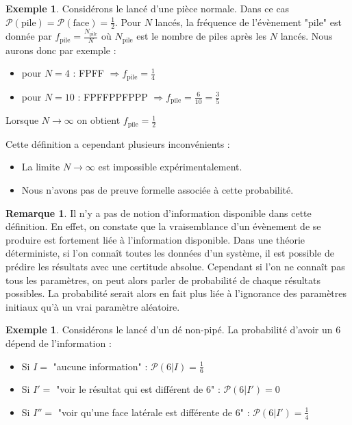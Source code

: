 \documentclass[a4paper,12pt]{report}
\theoremstyle{definition}
\newcommand{\ra}{\rightarrow}
\newcommand{\Ra}{\Rightarrow}
\renewcommand{\(}{\left(}
\renewcommand{\)}{\right)}
\renewcommand{\P}{\mathcal{P}}
\renewcommand{\t}{\text}
\newtheorem{rmk}[thm]{Remarque}
\newtheorem{exmp}[thm]{Exemple}
\begin{document}
        \begin{exmp}
            Considérons le lancé d'une pièce normale. Dans ce cas $\P(\t{pile}) = \P(\t{face}) = \frac{1}{2}$. Pour $N$ lancés, la fréquence de l'évènement "pile" est donnée par $f_{\t{pile}} = \frac{N_{\t{pile}}}{N}$ où $N_{\t{pile}}$ est le nombre de piles après les $N$ lancés. Nous aurons donc par exemple :\\
            \begin{itemize}[label = \textbullet]
                \item pour $N = 4$ : FPFF $\Ra f_{\t{pile}} = \frac{1}{4}$ 
                \item pour $N = 10$ : FPFFPPFPPP $\Ra f_{\t{pile}} = \frac{6}{10} = \frac{3}{5}$
            \end{itemize}
            Lorsque $N\ra\infty$ on obtient $f_{\t{pile}} = \frac{1}{2}$
        \end{exmp}
        
        Cette définition a cependant plusieurs inconvénients :
        \begin{itemize}
            \item La limite $N\ra\infty$ est impossible expérimentalement.
            \item Nous n'avons pas de preuve formelle associée à cette probabilité.
        \end{itemize}
        
        \begin{rmk}
            Il n'y a pas de notion d'information disponible dans cette définition. En effet, on constate que la vraisemblance d'un évènement de se produire est fortement liée à l'information disponible. Dans une théorie déterministe, si l'on connaît toutes les données d'un système, il est possible de prédire les résultats avec une certitude absolue. Cependant si l'on ne connaît pas tous les paramètres, on peut alors parler de probabilité de chaque résultats possibles. La probabilité serait alors en fait plus liée à l'ignorance des paramètres initiaux qu'à un vrai paramètre aléatoire.
        \end{rmk}
        
        \begin{exmp}
            Considérons le lancé d'un dé non-pipé. La probabilité d'avoir un 6 dépend de l'information :
            \begin{itemize}[label = \textbullet]
                \item Si $I =$ "aucune information" : $\P(6|I) = \frac{1}{6}$
                \item Si $I' =$ "voir le résultat qui est différent de 6" : $\P(6|I') = 0$
                \item Si $I'' =$ "voir qu'une face latérale est différente de 6" : $\P(6|I') = \frac{1}{4}$
            \end{itemize}
        \end{exmp}
        
\end{document}

